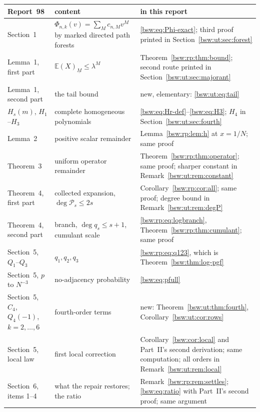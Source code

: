 \documentclass[11pt,letterpaper]{article}
\theoremstyle{definition}
\theoremstyle{remark}
\newcommand{\EE}{\mathbb E}
\newcommand{\fall}[2]{(#1)_{\underline{#2}}}
\begin{document}
{\small
\begin{longtable}{>{\raggedright\arraybackslash}p{}>{\raggedright\arraybackslash}p{}>{\raggedright\arraybackslash}p{}}
\toprule
Report~98 & content & in this report\\
\midrule
\endhead
\bottomrule
\endlastfoot
Section~1 & $\Phi_{n,k}(v)=\sum_Mc_{n,M}v^M$ by marked directed path
 forests & \eqref{bsw:eq:Phi-exact}; third proof printed in
 Section~\ref{bsw:ut:sec:forest}\\
Lemma~1, first part & $\EE\fall XM\le\lambda^M$ &
 Theorem~\ref{bsw:rp:thm:bound}; second route printed in
 Section~\ref{bsw:ut:sec:majorant}\\
Lemma~1, second part & the tail bound & new, elementary:
 \eqref{bsw:ut:eq:tail}\\
$H_s(m)$, $H_1$--$H_3$ & complete homogeneous polynomials &
 \eqref{bsw:eq:Hr-def}--\eqref{bsw:eq:H3}; $H_4$ in
 Section~\ref{bsw:ut:sec:fourth}\\
Lemma~2 & positive scalar remainder & Lemma~\ref{bsw:rp:lem:h} at
 $x=1/N$; same proof\\
Theorem~3 & uniform operator remainder &
 Theorem~\ref{bsw:rp:thm:operator}; same proof; sharper constant in
 Remark~\ref{bsw:ut:rem:constant}\\
Theorem~4, first part & collected expansion, $\deg\mathcal P_s\le2s$ &
 Corollary~\ref{bsw:rp:cor:all}; same proof; degree bound in
 Remark~\ref{bsw:ut:rem:degP}\\
Theorem~4, second part & branch, $\deg q_s\le s+1$, cumulant scale &
 \eqref{bsw:rp:eq:logbranch}, Theorem~\ref{bsw:rp:thm:cumulant}; same
 proof\\
Section~5, $Q_1$--$Q_3$ & $q_1,q_2,q_3$ & \eqref{bsw:rp:eq:q123}, which is
 Theorem~\ref{bsw:thm:log-pgf}\\
Section~5, $p$ to $N^{-3}$ & no-adjacency probability &
 \eqref{bsw:eq:pfull}\\
Section~5, $C_4$, $Q_4(-1)$, $k=2,\ldots,6$ & fourth-order terms & new:
 Theorem~\ref{bsw:ut:thm:fourth}, Corollary~\ref{bsw:ut:cor:rows}\\
Section~5, local law & first local correction &
 Corollary~\ref{bsw:cor:local} and Part~II's second derivation; same
 computation; all orders in Remark~\ref{bsw:ut:rem:local}\\
Section~6, items 1--4 & what the repair restores; the ratio &
 Remark~\ref{bsw:rp:rem:settles}; \eqref{bsw:eq:ratio} with Part~II's
 second proof; same argument\\

\end{longtable}}
\end{document}
